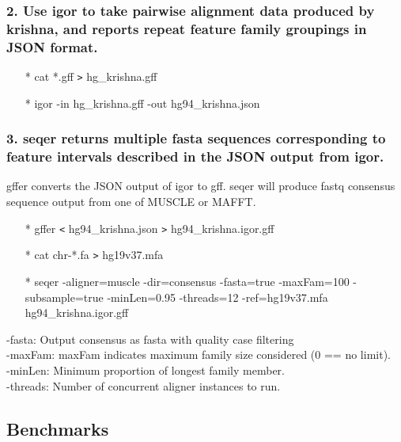 \documentclass[12pt]{report}
\begin{document}
\subsubsection{2. Use igor to take pairwise alignment data produced by krishna, and reports repeat feature family groupings in JSON format.}

\begin{enumerate}
	\item[*] cat *.gff \texttt{>} hg\_krishna.gff
	\item[*] igor -in hg\_krishna.gff -out hg94\_krishna.json
\end{enumerate}

\subsubsection{3. seqer returns multiple fasta sequences corresponding to feature intervals described in the JSON output from igor.}
gffer converts the JSON output of igor to gff. seqer will produce fastq consensus sequence output from one of MUSCLE or MAFFT. 

\begin{enumerate}
	\item[*] gffer \texttt{<} hg94\_krishna.json \texttt{>} hg94\_krishna.igor.gff
	\item[*] cat chr-*.fa \texttt{>} hg19v37.mfa
	\item[*] seqer -aligner=muscle -dir=consensus -fasta=true -maxFam=100 -subsample=true -minLen=0.95 -threads=12 -ref=hg19v37.mfa hg94\_krishna.igor.gff
\end{enumerate}

-fasta: Output consensus as fasta with quality case filtering\\
-maxFam: maxFam indicates maximum family size considered (0 == no limit).\\
-minLen: Minimum proportion of longest family member.\\
-threads: Number of concurrent aligner instances to run.


\subsection*{Benchmarks}
\end{document}
